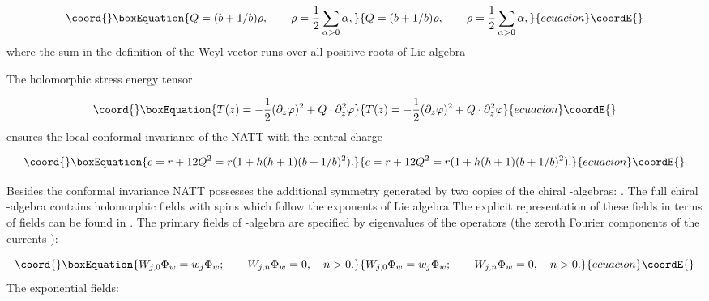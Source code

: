 \documentclass[a4paper,12pt]{article}
\begin{document}
\begin{equation}\coord{}\boxEquation{
Q=(b+1/b)\rho ,\qquad \rho =\frac 12\sum_{\alpha >0}\alpha ,  \label{q}
}{
Q=(b+1/b)\rho ,\qquad \rho =\frac 12\sum_{\alpha >0}\alpha ,  }{ecuacion}\coordE{}\end{equation}
where the sum in the definition of the Weyl vector \myHighlight{$\rho $}\coordHE{} runs over all
positive roots \myHighlight{$\alpha $}\coordHE{} of Lie algebra \coordHE{}

The holomorphic stress energy tensor

\begin{equation}\coord{}\boxEquation{
T(z)=-\frac 12(\partial _z\varphi )^2+Q\cdot \partial _z^2\varphi  \label{se}
}{
T(z)=-\frac 12(\partial _z\varphi )^2+Q\cdot \partial _z^2\varphi  }{ecuacion}\coordE{}\end{equation}
ensures the local conformal invariance of the NATT with the central charge

\begin{equation}\coord{}\boxEquation{
c=r+12Q^2=r(1+h(h+1)(b+1/b)^2).  \label{cc}
}{
c=r+12Q^2=r(1+h(h+1)(b+1/b)^2).  }{ecuacion}\coordE{}\end{equation}

Besides the conformal invariance NATT possesses the additional symmetry
generated by two copies of the chiral \coordHE{}-algebras: \coordHE{}  \coordHE{}. The full chiral \coordHE{}-algebra contains \coordHE{} holomorphic
fields \coordHE{}  \coordHE{} with spins \coordHE{} which follow the exponents of
Lie algebra \coordHE{} The explicit representation of these fields in terms of
fields \coordHE{} can be found in \cite{FL}. The primary fields 
\coordHE{} of \coordHE{}-algebra are specified by \coordHE{} eigenvalues \coordHE{} of the operators \coordHE{} (the zeroth Fourier components of the
currents \myHighlight{$W_j(z)$}\coordHE{}):

\begin{equation}\coord{}\boxEquation{
W_{j,0}\Phi _w=w_j\Phi _w;\qquad W_{j,n}\Phi _w=0,\quad n>0.  \label{w}
}{
W_{j,0}\Phi _w=w_j\Phi _w;\qquad W_{j,n}\Phi _w=0,\quad n>0.  }{ecuacion}\coordE{}\end{equation}
The exponential fields:
\end{document}
